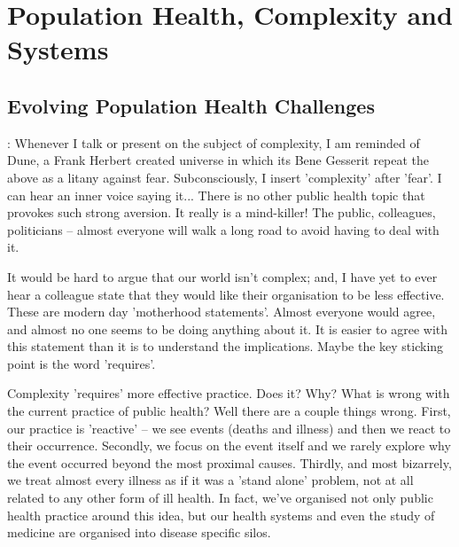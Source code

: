 \part{Population Health, Complexity and Systems}

\chapter{Evolving Population Health Challenges}%



: Whenever I talk or present on the subject of complexity, I am reminded of Dune, a Frank Herbert created universe in which its Bene Gesserit repeat the above as a litany against fear. Subconsciously, I insert 'complexity' after 'fear'. I can hear an inner voice saying it... There is no other public health topic that provokes such strong aversion. It really is a mind-killer! The public, colleagues, politicians -- almost everyone will walk a long road to avoid having to deal with it.

It would be hard to argue that our world isn't complex; and, I have yet to ever hear a colleague state that they would like their organisation to be less effective. These are modern day 'motherhood statements'. Almost everyone would agree, and almost no one seems to be doing anything about it. It is easier to agree with this statement than it is to understand the implications. Maybe the key sticking point is the word 'requires'.

Complexity 'requires' more effective practice. Does it? Why? What is wrong with the current practice of public health? Well there are a couple things wrong. First, our practice is 'reactive' -- we see events (deaths and illness) and then we react to their occurrence. Secondly, we focus on the event itself and we rarely explore why the event occurred beyond the most proximal causes. Thirdly, and most bizarrely, we treat almost every illness as if it was a 'stand alone' problem, not at all related to any other form of ill health. In fact, we've organised not only public health practice around this idea, but our health systems and even the study of medicine are organised into disease specific silos. 

